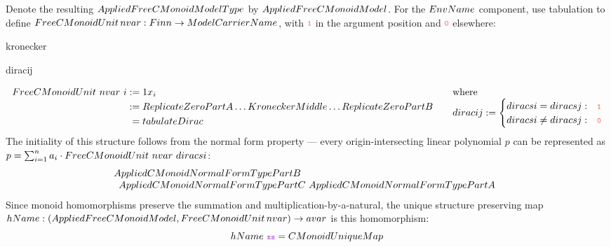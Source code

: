 Denote the resulting $\AppliedFreeCMonoidModelType$ by $\AppliedFreeCMonoidModel$.  For the  $\EnvName$ component, use tabulation to define
$ \FreeCMonoidUnit\,\nvar : \Finn \to \ModelCarrierName$, with $\idrisdata 1$ in
the argument position and $\idrisdata 0$ elsewhere:
\renewcommand\tabulateDirac[1][]{\UseVerb[#1]{tabulateDirac}}
\renewcommand\dirac[1][]{\UseVerb[#1]{dirac}}
\begin{SaveVerbatim}[commandchars=\\\{\}]{kronecker}
\end{SaveVerbatim}
\renewcommand\diracij[1][]{\UseVerb[#1]{diracij}}
\begin{SaveVerbatim}[commandchars=\\\{\}]{diracij}
\KatlaSpace{}\KatlaSpace{}
\end{SaveVerbatim}
\[
\begin{array}[t]{@{}l@{\qquad}l@{}}
\begin{aligned}[t]
\FreeCMonoidUnit\ \nvar\ i \definedby{}& 1x_i \\
\definedby{}& \ReplicateZeroPartA \ldots\KroneckerMiddle\ldots\ReplicateZeroPartB \\
={}& \tabulateDirac
\end{aligned}
&
\begin{array}[t]{@{}l@{}}
\text{where}\\ \diracij \definedby
\begin{cases}
  \diracsi = \diracsj: & \idrisdata{1} \\
  \diracsi \neq \diracsj:  & \idrisdata{0}
\end{cases}
\end{array}
\end{array}
\]
The initiality of this structure follows from the normal form property
--- every origin-intersecting linear polynomial $p$ can be represented
as $p = \sum_{i=1}^n a_i\cdot \FreeCMonoidUnit\ \nvar\ \diracsi$:\\
\[
\begin{array}{@{}l@{}}
  \AppliedCMonoidNormalFormTypePartB
  \\
  \multicolumn{1}{r}{%
    \AppliedCMonoidNormalFormTypePartC\ \AppliedCMonoidNormalFormTypePartA
  }
\end{array}
\]
Since monoid homomorphisms preserve the summation and
multiplication-by-a-natural, the unique structure
preserving map $\hName : \pair{\AppliedFreeCMonoidModel}{\FreeCMonoidUnit\,\nvar} \to \avar$
is this homomorphism:
\[
\hName\ \idrisvar{xs}= \CMonoidUniqueMap{}
\]

